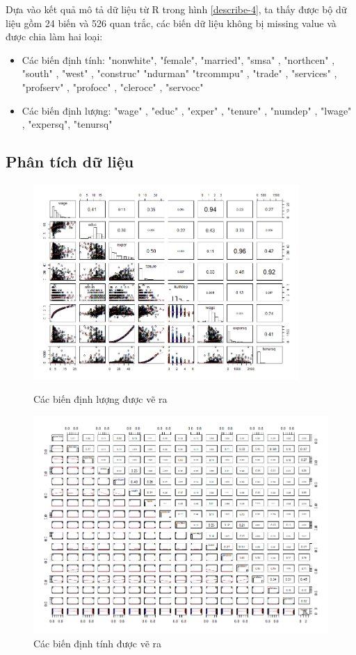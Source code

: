 Dựa vào kết quả mô tả dữ liệu từ R trong hình \ref{describe-4}, ta thấy được bộ dữ liệu gồm  24 biến và 526 quan trắc, các biến dữ liệu không bị missing value và được chia làm hai loại:
\begin{itemize}
	\item Các biến định tính: "nonwhite", "female", "married", "smsa"  ,   "northcen" , "south"  ,  "west"  ,   "construc" "ndurman"  "trcommpu" , "trade" ,   "services" , "profserv" , "profocc" , "clerocc" , "servocc" 
	\item Các biến định lượng: "wage"  ,  "educ"  ,  "exper" ,  "tenure" , "numdep" , "lwage" ,  "expersq", "tenursq"
\end{itemize}
\subsection*{Phân tích dữ liệu}
\begin{figure}[H]
	\includegraphics[width=0.9\textwidth]{../Photo Of Result/Plot-dinhluong-data4}
	\caption{Các biến định lượng được vẽ ra}
	\includegraphics[width=\textwidth]{../Photo Of Result/Plot-dinhtinh-data4}
	\caption{Các biến định tính được vẽ ra}
	\label{plot_data4}
\end{figure}

